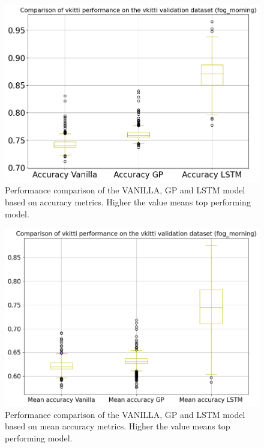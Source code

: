 %		

	\begin{figure}
		\centering
		
		\includegraphics[width=13cm]{images/two_vkitti_acc.png}
		\caption{Performance comparison of the VANILLA, GP and LSTM model based on accuracy metrics. Higher the value means top performing model.}
		\label{fig:performance_metric_vkitti_two_class_box_plot}
	\end{figure}

	\begin{figure}
		\centering
	
		\includegraphics[width=13cm]{images/two_vkitti_meanacc.png}
		\caption{Performance comparison of the VANILLA, GP and LSTM model based on mean accuracy metrics. Higher the value means top performing model.}
		\label{fig:performance_metric_vkitti_two_class_box_plot}
	\end{figure}
	
